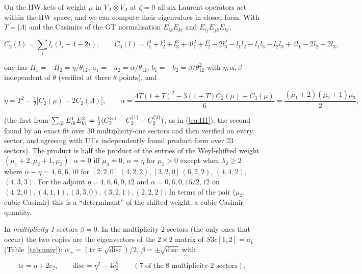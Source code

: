 \documentclass[11pt]{article}
\begin{document}
On the HW kets of weight $\mu$ in $V_\Lambda\otimes V_\Lambda$ at $\zeta=0$ all six Laurent operators act within the HW space, and we can compute their eigenvalues in closed form.
With $T=|\Lambda|$ and the Casimirs of the GT normalisation $E_{ik}E_{ki}$ and $E_{ij}E_{jk}E_{ki}$,

\begin{equation}
C_2(l)=\sum_il_i(l_i+4-2i),\qquad C_3(l)=l_1^3+l_2^3+l_3^3+4l_1^2+l_2^2-2l_3^2-l_1l_2-l_1l_3-l_2l_3+4l_1-2l_2-2l_3,\label{eq:Cas}
\end{equation}

one has $H_1=-H_2=\eta/\theta_{12}$, $a_1=-a_2=\alpha/\theta_{12}$, $b_1=-b_2=\beta/\theta_{12}^2$ with $\eta,\alpha,\beta$ independent of $\theta$ (verified at three $\theta$ points), and

\begin{equation}
\eta=T^2-\tfrac12\bigl[C_2(\mu)-2C_2(\Lambda)\bigr],\qquad
\alpha=\frac{4T(1+T)^2-3(1+T)C_2(\mu)+C_3(\mu)}6=\frac{(\mu_1+2)(\mu_2+1)\mu_3}2,\label{eq:etaalpha}
\end{equation}

(the first from $\sum_{ik}E^1_{ik}E^2_{ki}=\tfrac12(C_2^{\rm tot}-C_2^{(1)}-C_2^{(2)})$, as in (\ref{eq:H1}); the second found by an exact fit over 30 multiplicity-one sectors and then verified on every sector, and agreeing with U1's independently found product form over 23 sectors).
The product is half the product of the entries of the Weyl-shifted weight $(\mu_1+2,\mu_2+1,\mu_3)$: $\alpha=0$ iff $\mu_3=0$, $\alpha=\eta$ for $\mu_3>0$ except when $\lambda_2\ge2$ where $\alpha-\eta=4,6,6,10$ for $[2,2,0]\,(4,2,2)$, $[3,2,0]\,(6,2,2)$, $(4,4,2)$, $(4,3,3)$. For the adjoint $\eta=4,6,6,9,12$ and $\alpha=0,6,0,15/2,12$ on $(4,2,0),(4,1,1),(3,3,0),(3,2,1),(2,2,2)$. In terms of the pair ($\mu_3$, cubic Casimir) this is a ``determinant'' of the shifted weight: a cubic Casimir quantity.

In \emph{multiplicity-1} sectors $\beta=0$. In the multiplicity-2 sectors (the only ones that occur) the two copies are the eigenvectors of the $2\times2$ matrix of $S3c[1,2]=a_1$ (Table~\ref{tab:univ}): $\alpha_\pm=(\mathrm{tr}\mp\sqrt{\mathrm{disc}})/2$, $\beta=\pm\sqrt{\mathrm{disc}}$ with

\begin{equation}
\mathrm{tr}=\eta+2c_2,\qquad\mathrm{disc}=\eta^2-4c_2^2\qquad(7\text{ of the 8 multiplicity-2 sectors}),\label{eq:multlaw}
\end{equation}
\end{document}
